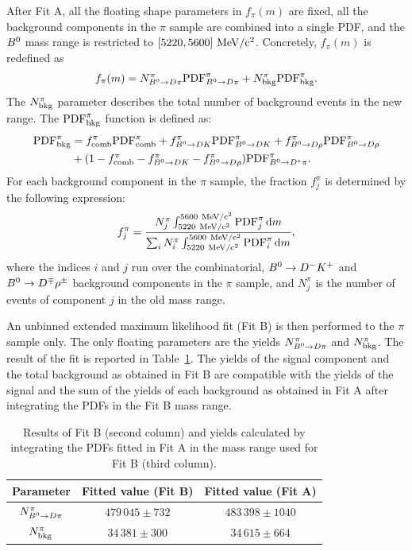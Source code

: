 After Fit A, all the floating shape parameters in $f_{\pi}(m)$ are
fixed, all the background components in the $\pi$ sample are combined into a
single PDF, and the $B^0$ mass range is restricted to $[5220,5600]~\rm MeV/c^{2}$.
Concretely, $f_{\pi}(m)$ is redefined as
%
\begin{equation}
	f_{\pi}(m) = N^{\pi}_{B^0\rightarrow D\pi}{\rm{PDF}}^{\pi}_{B^0\rightarrow D\pi} + N^{\pi}_{\rm bkg}{\rm{PDF}}^{\pi}_{\rm bkg}.
\end{equation}
%
The $N^{\pi}_{\rm bkg}$ parameter describes the total number of
background events in the new range. The ${\rm{PDF}}^{\pi}_{\rm bkg}$ function is
defined as:
%
\begin{equation}
	\begin{split}
		\rm{PDF}^{\pi}_{\rm bkg} &= f^{\pi}_{\rm comb}{\rm{PDF}}^{\pi}_{\rm comb}
		+ f^{\pi}_{B^0\rightarrow DK}{\rm{PDF}}^{\pi}_{B^0\rightarrow DK} + f^{\pi}_{B^0\rightarrow D\rho}{\rm{PDF}}^{\pi}_{B^0\rightarrow D\rho} \\
		& + (1 - f^{\pi}_{\rm comb} - f^{\pi}_{B^0\rightarrow DK} - f^{\pi}_{B^0\rightarrow D\rho}){\rm{PDF}}^{\pi}_{B^0\rightarrow D^*\pi}.
	\end{split}
\end{equation}
%
For each background component in the $\pi$ sample, the fraction
$f^{\pi}_{j}$ is determined by the following expression:
%
\begin{equation}
	f^{\pi}_{j} = \frac{ N^{\pi}_{j}\int_{5220~\rm MeV/c^{2}}^{5600~\rm MeV/c^{2}} {\rm{PDF}}^{\pi}_{j} \,\mathrm{d} m }{\sum_{i} N^{\pi}_{i} \int_{5220~\rm MeV/c^{2}}^{5600~\rm MeV/c^{2}} {\rm{PDF}}^{\pi}_{i} \,\mathrm{d} m},
\end{equation}
%
where the indices $i$ and $j$ run over the combinatorial, $B^0\rightarrow D^-K^+$ and $B^0\rightarrow D^\mp\rho^\pm$ background components
in the $\pi$ sample, and $N^{\pi}_{j}$ is the number of events of component $j$ in the old mass range.

An unbinned extended maximum
likelihood fit (Fit B) is then performed to the $\pi$ sample only. The only floating
parameters are the yields $N^{\pi}_{B^0\rightarrow D\pi}$ and $N^{\pi}_{\rm bkg}$. The
result of the fit is reported in Table~\ref{tab:FitBfloating}.
The yields of the signal component and the total background as obtained in Fit B are compatible
with the yields of the signal and the sum of the yields of each background as obtained in Fit A
after integrating the PDFs in the Fit B mass range.
\begin{table}
	\begin{center}
		\caption{Results of Fit B (second column) and 
			     yields calculated by integrating the PDFs fitted in Fit A in the mass range used for Fit B (third column).}
		\begin{tabular}{ccc}
			\toprule
			Parameter & Fitted value (Fit B) & Fitted value (Fit A)  \\
			\hline
			$N^{\pi}_{B^0\rightarrow D\pi}$ & $479\,045\pm732$ & $483\,398\pm1040$ \\
			$N^{\pi}_{\rm bkg}$ & $34\,381\pm300$ & $34\,615\pm664$ \\
			\bottomrule
		\end{tabular}
		\label{tab:FitBfloating}
	\end{center}
\end{table}

